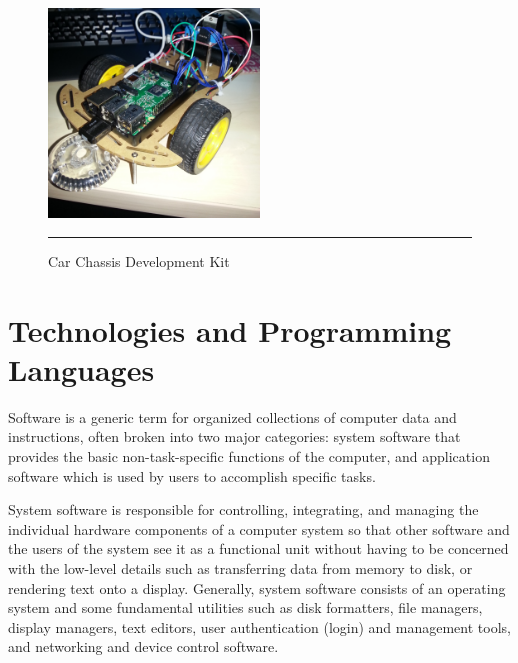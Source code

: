 \begin{figure}[h!]
        \centering
        \includegraphics[width=0.5\textwidth]{./Pictures/Car-Chassis-Kit3.jpg}
		\rule{0.5\textwidth}{1pt}
        \caption{Car Chassis Development Kit}
\end{figure}
\clearpage
\section{Technologies and Programming Languages}

Software is a generic term for organized collections of computer data and instructions, often broken into two major categories: system software that provides the basic non-task-specific functions of the computer, and application software which is used by users to accomplish specific tasks.

System software is responsible for controlling, integrating, and managing the individual hardware components of a computer system so that other software and the users of the system see it as a functional unit without having to be concerned with the low-level details such as transferring data from memory to disk, or rendering text onto a display. Generally, system software consists of an operating system and some fundamental utilities such as disk formatters, file managers, display managers, text editors, user authentication (login) and management tools, and networking and device control software.

